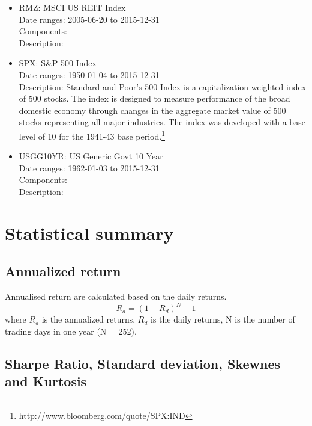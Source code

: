 \documentclass[12pt]{article}
\begin{document}
\begin{itemize}
Date ranges: 1979-01-02 to 2015-12-31 \\
Description: The Russell 3000 Index is composed of 3000 large U.S. companies, as determined by market capitalization. This portfolio of Securities represents approximately 98\% of the investable U.S. equity market. The Russell 3000 Index is comprised of stocks within the Russell 1000 and the Russell 2000 Indices. The index was developed with a base value of 140.00 as of December 31, 1986.\footnote{http://www.bloomberg.com/quote/RAY:IND}
\item RMZ: MSCI US REIT Index\\
Date ranges: 2005-06-20 to 2015-12-31 \\
Components: \\
Description:
\item SPX: S\&P 500 Index\\
Date ranges: 1950-01-04 to 2015-12-31 \\
Description: Standard and Poor's 500 Index is a capitalization-weighted index of 500 stocks. The index is designed to measure performance of the broad domestic economy through changes in the aggregate market value of 500 stocks representing all major industries. The index was developed with a base level of 10 for the 1941-43 base period.\footnote{http://www.bloomberg.com/quote/SPX:IND}
\item USGG10YR: US Generic Govt 10 Year\\
Date ranges: 1962-01-03 to 2015-12-31 \\
Components: \\
Description:
\end{itemize}


\section{Statistical summary}

\subsection{Annualized return}

Annualised return are calculated based on the daily returns. 
\begin{equation}
R_a = (1+R_d)^{N} -1
\end{equation}
where $R_a$ is the annualized returns, $R_d$ is the daily returns, N is the number of trading days in one year (N = 252).

\subsection{Sharpe Ratio, Standard deviation, Skewnes and Kurtosis}
\end{document}
